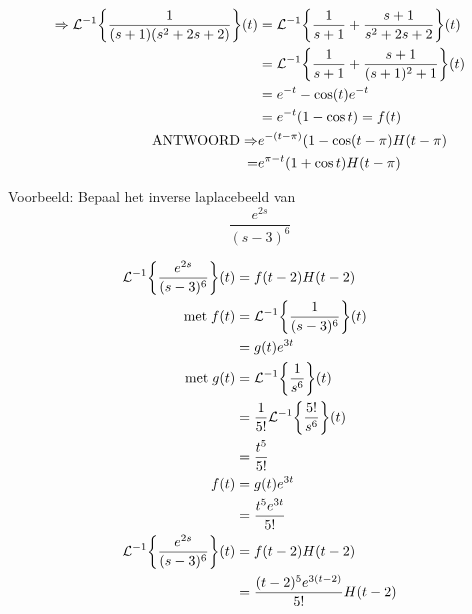 \documentclass[12pt]{report}
\newcommand{\example}[2]{
    \hrulefill
    
    Voorbeeld: #1
    
    #2
    
    \hrulefill
}
\begin{document}
{\begin{equation*}
\begin{split}
                                                                       \Rightarrow \mathcal{L}^{-1}\bigg\{\frac{1}{(s+1)(s^2+2s+2)}\bigg\}(t) & = \mathcal{L}^{-1}\bigg\{\frac{1}{s + 1} + \frac{s + 1}{s^2 + 2s + 2}\bigg\}(t) \\                  
                                                                       & = \mathcal{L}^{-1}\bigg\{\frac{1}{s + 1} + \frac{s + 1}{(s+1)^2 + 1}\bigg\}(t) \\    
                                                                       & = e^{-t} - \cos(t) e^{-t} \\
                                                                       & = e^{-t}( 1 - \cos t) = f(t) \\
                                                                       \hbox{ANTWOORD}\Rightarrow & e^{-(t - \pi)}(1 - \cos(t - \pi)H(t - \pi) \\
                                                                                 = & e^{\pi - t}(1 + \cos t)H(t - \pi)
     \end{split}
    \end{equation*}

}
\example{Bepaal het inverse laplacebeeld van 
    $$\frac{e^{2s}}{(s-3)^6}$$
}{
    \begin{equation*}
     \begin{split}
      \mathcal{L}^{-1}\bigg\{\frac{e^{2s}}{(s-3)^6}\bigg\}(t) & = f(t-2)H(t - 2) \\ 
                                                    \hbox{met} \; f(t) & = \mathcal{L}^{-1}\bigg\{\frac{1}{(s-3)^6}\bigg\}(t) \\
                                                                       & = g(t)e^{3t} \\
                                                    \hbox{met} \; g(t) & = \mathcal{L}^{-1}\bigg\{\frac{1}{s^6}\bigg\}(t) \\
                                                                       & = \frac{1}{5!}\mathcal{L}^{-1}\bigg\{\frac{5!}{s^6}\bigg\}(t) \\
                                                                       & = \frac{t^5}{5!} \\
                                                    f(t) & = g(t)e^{3t} \\
                                                         & = \frac{t^5e^{3t}}{5!} \\
     \mathcal{L}^{-1}\bigg\{\frac{e^{2s}}{(s-3)^6}\bigg\}(t) & = f(t-2)H(t - 2) \\ 
                                                             & = \frac{(t-2)^5e^{3(t-2)}}{5!}H(t-2)
     \end{split}
    \end{equation*}

}
\end{document}
